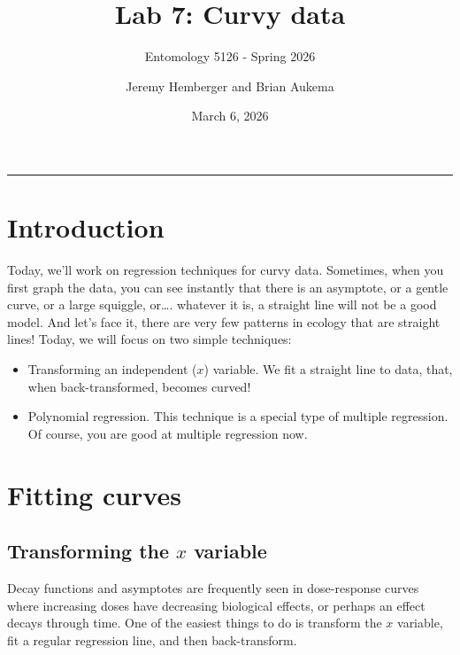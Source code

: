 \documentclass[
  letterpaper,
  DIV=11,
  numbers=noendperiod]{scrartcl}
\title{Lab 7: Curvy data}
\subtitle{Entomology 5126 - Spring 2026}
\author{Jeremy Hemberger and Brian Aukema}
\date{March 6, 2026}
\renewcommand*\contentsname{Table of contents}
\newcommand\contentsname{Table of contents}
\begin{document}
\maketitle

\renewcommand*\contentsname{Table of contents}
{
\hypersetup{linkcolor=}
\setcounter{tocdepth}{3}
\tableofcontents
}

\begin{center}\rule{0.5\linewidth}{0.5pt}\end{center}

\section{Introduction}\label{introduction}

Today, we'll work on regression techniques for curvy data. Sometimes,
when you first graph the data, you can see instantly that there is an
asymptote, or a gentle curve, or a large squiggle, or\ldots. whatever it
is, a straight line will not be a good model. And let's face it, there
are very few patterns in ecology that are straight lines! Today, we will
focus on two simple techniques:

\begin{itemize}
\item
  Transforming an independent (\(x\)) variable. We fit a straight line
  to data, that, when back-transformed, becomes curved!
\item
  Polynomial regression. This technique is a special type of multiple
  regression. Of course, you are good at multiple regression now.
\end{itemize}

\section{Fitting curves}\label{fitting-curves}

\subsection{\texorpdfstring{Transforming the \(x\)
variable}{Transforming the x variable}}\label{transforming-the-x-variable}

Decay functions and asymptotes are frequently seen in dose-response
curves where increasing doses have decreasing biological effects, or
perhaps an effect decays through time. One of the easiest things to do
is transform the \(x\) variable, fit a regular regression line, and then
back-transform.
\end{document}

